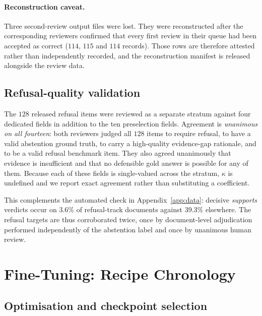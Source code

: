 \paragraph{Reconstruction caveat.} Three second-review output files were lost. They
were reconstructed after the corresponding reviewers confirmed that every first
review in their queue had been accepted as correct ($114$, $115$ and $114$
records). Those rows are therefore attested rather than independently recorded,
and the reconstruction manifest is released alongside the review data.

\subsection{Refusal-quality validation}
\label{app:refusalquality}

The $128$ released refusal items were reviewed as a separate stratum against four
dedicated fields in addition to the ten preselection fields. Agreement is
\emph{unanimous on all fourteen}: both reviewers judged all $128$ items to
require refusal, to have a valid abstention ground truth, to carry a
high-quality evidence-gap rationale, and to be a valid refusal benchmark item.
They also agreed unanimously that evidence is insufficient and that no defensible
gold answer is possible for any of them. Because each of these fields is
single-valued across the stratum, $\kappa$ is undefined and we report exact
agreement rather than substituting a coefficient.

This complements the automated check in Appendix~\ref{app:data}: decisive
\textit{supports} verdicts occur on $3.6\%$ of refusal-track documents against
$39.3\%$ elsewhere. The refusal targets are thus corroborated twice, once by
document-level adjudication performed independently of the abstention label and
once by unanimous human review.

\section{Fine-Tuning: Recipe Chronology}
\label{app:sft}

\subsection{Optimisation and checkpoint selection}

